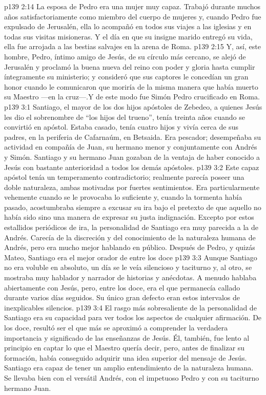 \vs p139 2:14 \pc La esposa de Pedro era una mujer muy capaz. Trabajó durante muchos años satisfactoriamente como miembro del cuerpo de mujeres y, cuando Pedro fue expulsado de Jerusalén, ella lo acompañó en todos sus viajes a las iglesias y en todas sus visitas misioneras. Y el día en que su insigne marido entregó su vida, ella fue arrojada a las bestias salvajes en la arena de Roma.
\vs p139 2:15 \pc Y, así, este hombre, Pedro, íntimo amigo de Jesús, de su círculo más cercano, se alejó de Jerusalén y proclamó la buena nueva del reino con poder y gloria hasta cumplir íntegramente su ministerio; y consideró que sus captores le concedían un gran honor cuando le comunicaron que moriría de la misma manera que había muerto su Maestro ---en la cruz---.Y de este modo fue Simón Pedro crucificado en Roma.
\vs p139 3:1 Santiago, el mayor de los dos hijos apóstoles de Zebedeo, a quienes Jesús les dio el sobrenombre de “los hijos del trueno”, tenía treinta años cuando se convirtió en apóstol. Estaba casado, tenía cuatro hijos y vivía cerca de sus padres, en la periferia de Cafarnaúm, en Betsaida. Era pescador; desempeñaba su actividad en compañía de Juan, su hermano menor y conjuntamente con Andrés y Simón. Santiago y su hermano Juan gozaban de la ventaja de haber conocido a Jesús con bastante anterioridad a todos los demás apóstoles.
\vs p139 3:2 \pc Este capaz apóstol tenía un temperamento contradictorio; realmente parecía poseer una doble naturaleza, ambas motivadas por fuertes sentimientos. Era particularmente vehemente cuando se le provocaba lo suficiente y, cuando la tormenta había pasado, acostumbraba siempre a excusar su ira bajo el pretexto de que aquello no había sido sino una manera de expresar su justa indignación. Excepto por estos estallidos periódicos de ira, la personalidad de Santiago era muy parecida a la de Andrés. Carecía de la discreción y del conocimiento de la naturaleza humana de Andrés, pero era mucho mejor hablando en público. Después de Pedro, y quizás Mateo, Santiago era el mejor orador de entre los doce
\vs p139 3:3 Aunque Santiago no era voluble en absoluto, un día se le veía silencioso y taciturno y, al otro, se mostraba muy hablador y narrador de historias y anécdotas. A menudo hablaba abiertamente con Jesús, pero, entre los doce, era el que permanecía callado durante varios días seguidos. Su único gran defecto eran estos intervalos de inexplicables silencios.
\vs p139 3:4 El rasgo más sobresaliente de la personalidad de Santiago era su capacidad para ver todos los aspectos de cualquier afirmación. De los doce, resultó ser el que más se aproximó a comprender la verdadera importancia y significado de las enseñanzas de Jesús. Él, también, fue lento al principio en captar lo que el Maestro quería decir, pero, antes de finalizar su formación, había conseguido adquirir una idea superior del mensaje de Jesús. Santiago era capaz de tener un amplio entendimiento de la naturaleza humana. Se llevaba bien con el versátil Andrés, con el impetuoso Pedro y con su taciturno hermano Juan.
